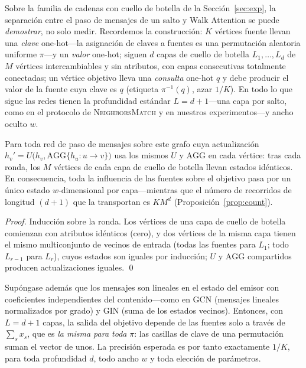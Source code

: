 Sobre la familia de cadenas con cuello de botella de la Sección~\ref{sec:exp},
la separación entre el paso de mensajes de un salto y Walk Attention se puede
\emph{demostrar}, no solo medir. Recordemos la construcción: $K$ vértices
fuente llevan una \emph{clave} one-hot---la asignación de claves a fuentes es
una permutación aleatoria uniforme $\pi$---y un \emph{valor} one-hot; siguen
$d$ capas de cuello de botella $L_1,\dots,L_d$ de $M$ vértices intercambiables
y sin atributos, con capas consecutivas totalmente conectadas; un vértice
objetivo lleva una \emph{consulta} one-hot $q$ y debe producir el valor de la
fuente cuya clave es $q$ (etiqueta $\pi^{-1}(q)$, azar $1/K$). En todo lo que
sigue las redes tienen la profundidad estándar $L=d+1$---una capa por salto,
como en el protocolo de \textsc{NeighborsMatch} \cite{alon2021bottleneck} y en
nuestros experimentos---y ancho oculto $w$.

\begin{proposition}\label{prop:collapse}
Para toda red de paso de mensajes sobre este grafo cuya actualización
$h_v' = U\bigl(h_v,\mathrm{AGG}\{h_u : u\to v\}\bigr)$ usa los mismos $U$ y
$\mathrm{AGG}$ en cada vértice: tras cada ronda, los $M$ vértices de cada capa
de cuello de botella llevan estados idénticos. En consecuencia, toda la
influencia de las fuentes sobre el objetivo pasa por un único estado
$w$-dimensional por capa---mientras que el número de recorridos de longitud
$(d{+}1)$ que la transportan es $K M^{d}$ (Proposición~\ref{prop:count}).
\end{proposition}

\begin{proof}
Inducción sobre la ronda. Los vértices de una capa de cuello de botella
comienzan con atributos idénticos (cero), y dos vértices de la misma capa
tienen el mismo multiconjunto de vecinos de entrada (todas las fuentes para
$L_1$; todo $L_{r-1}$ para $L_r$), cuyos estados son iguales por inducción;
$U$ y $\mathrm{AGG}$ compartidos producen actualizaciones iguales. \qed
\end{proof}

\begin{proposition}
\label{prop:blind}
Supóngase además que los mensajes son lineales en el estado del emisor con
coeficientes independientes del contenido---como en GCN (mensajes lineales
normalizados por grado) y GIN (suma de los estados vecinos). Entonces, con
$L=d+1$ capas, la salida del objetivo depende de las fuentes solo a través de
$\sum_{s}x_s$, que es \emph{la misma para toda} $\pi$: las casillas de clave de
una permutación suman el vector de unos. La precisión esperada es por tanto
exactamente $1/K$, para toda profundidad $d$, todo ancho $w$ y toda elección de
parámetros.
\end{proposition}

